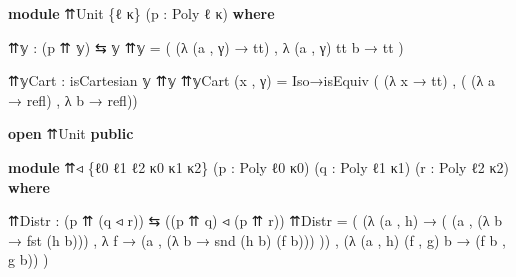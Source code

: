 \documentclass[
  11pt,
  oneside,
  article]{memoir}
\newenvironment{Shaded}{}{}
\newcommand{\KeywordTok}[1]{\textcolor[rgb]{0.00,0.44,0.13}{\textbf{#1}}}
\newcommand{\NormalTok}[1]{#1}
\newcommand{\OtherTok}[1]{\textcolor[rgb]{0.00,0.44,0.13}{#1}}
\theoremstyle{definition}
\theoremstyle{plain}
\newcommand{\0}{\textsf{0}}
\newcommand{\1}{\tn{\textsf{1}}}
\begin{document}
\begin{Shaded}
\begin{Highlighting}[]
\KeywordTok{module}\NormalTok{ ⇈Unit }\OtherTok{\{}\NormalTok{ℓ κ}\OtherTok{\}} \OtherTok{(}\NormalTok{p }\OtherTok{:}\NormalTok{ Poly ℓ κ}\OtherTok{)} \KeywordTok{where}

\NormalTok{    ⇈𝕪 }\OtherTok{:} \OtherTok{(}\NormalTok{p ⇈ 𝕪}\OtherTok{)}\NormalTok{ ⇆ 𝕪}
\NormalTok{    ⇈𝕪 }\OtherTok{=} \OtherTok{(} \OtherTok{(λ} \OtherTok{(}\NormalTok{a , γ}\OtherTok{)} \OtherTok{→}\NormalTok{ tt}\OtherTok{)}\NormalTok{ , }\OtherTok{λ} \OtherTok{(}\NormalTok{a , γ}\OtherTok{)}\NormalTok{ tt b }\OtherTok{→}\NormalTok{ tt }\OtherTok{)}

\NormalTok{    ⇈𝕪Cart }\OtherTok{:}\NormalTok{ isCartesian 𝕪 ⇈𝕪}
\NormalTok{    ⇈𝕪Cart }\OtherTok{(}\NormalTok{x , γ}\OtherTok{)} \OtherTok{=} 
\NormalTok{        Iso→isEquiv }\OtherTok{(} \OtherTok{(λ}\NormalTok{ x }\OtherTok{→}\NormalTok{ tt}\OtherTok{)} 
\NormalTok{                    , }\OtherTok{(} \OtherTok{(λ}\NormalTok{ a }\OtherTok{→}\NormalTok{ refl}\OtherTok{)} 
\NormalTok{                      , }\OtherTok{λ}\NormalTok{ b }\OtherTok{→}\NormalTok{ refl}\OtherTok{))}

\KeywordTok{open}\NormalTok{ ⇈Unit }\KeywordTok{public}

\KeywordTok{module}\NormalTok{ ⇈◃ }\OtherTok{\{}\NormalTok{ℓ0 ℓ1 ℓ2 κ0 κ1 κ2}\OtherTok{\}} \OtherTok{(}\NormalTok{p }\OtherTok{:}\NormalTok{ Poly ℓ0 κ0}\OtherTok{)} 
          \OtherTok{(}\NormalTok{q }\OtherTok{:}\NormalTok{ Poly ℓ1 κ1}\OtherTok{)} \OtherTok{(}\NormalTok{r }\OtherTok{:}\NormalTok{ Poly ℓ2 κ2}\OtherTok{)} \KeywordTok{where}

\NormalTok{    ⇈Distr }\OtherTok{:} \OtherTok{(}\NormalTok{p ⇈ }\OtherTok{(}\NormalTok{q ◃ r}\OtherTok{))}\NormalTok{ ⇆ }\OtherTok{((}\NormalTok{p ⇈ q}\OtherTok{)}\NormalTok{ ◃ }\OtherTok{(}\NormalTok{p ⇈ r}\OtherTok{))}
\NormalTok{    ⇈Distr }\OtherTok{=} \OtherTok{(} \OtherTok{(λ} \OtherTok{(}\NormalTok{a , h}\OtherTok{)} 
                  \OtherTok{→} \OtherTok{(} \OtherTok{(}\NormalTok{a , }\OtherTok{(λ}\NormalTok{ b }\OtherTok{→}\NormalTok{ fst }\OtherTok{(}\NormalTok{h b}\OtherTok{)))} 
\NormalTok{                    , }\OtherTok{λ}\NormalTok{ f }\OtherTok{→} \OtherTok{(}\NormalTok{a , }\OtherTok{(λ}\NormalTok{ b }\OtherTok{→}\NormalTok{ snd }\OtherTok{(}\NormalTok{h b}\OtherTok{)} \OtherTok{(}\NormalTok{f b}\OtherTok{)))} \OtherTok{))} 
\NormalTok{             , }\OtherTok{(λ} \OtherTok{(}\NormalTok{a , h}\OtherTok{)} \OtherTok{(}\NormalTok{f , g}\OtherTok{)}\NormalTok{ b }\OtherTok{→} \OtherTok{(}\NormalTok{f b , g b}\OtherTok{))} \OtherTok{)}
    

\end{Highlighting}
\end{Shaded}
\end{document}
